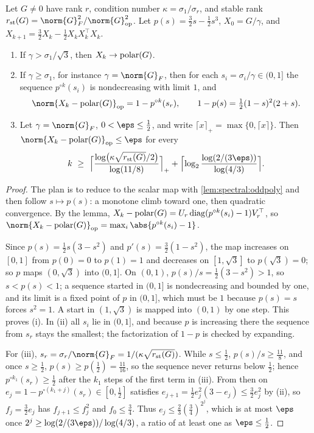 \begin{refsection}
\begin{theorem}\label{thm:spectral:ns}
Let $G\ne0$ have rank $r$, condition number $\kappa=\sigma_1/\sigma_r$, and stable rank $\spectralrst(G)=\norm{G}_F^2/\norm{G}_{\op}^2$. Let $p(s)=\frac32s-\frac12s^3$, $X_0=G/\gamma$, and $X_{k+1}=\frac32X_k-\frac12X_kX_k^\top X_k$.
\begin{enumerate}
\item If $\gamma>\sigma_1/\sqrt3$, then $X_k\to\operatorname{polar}(G)$.
\item If $\gamma\ge\sigma_1$, for instance $\gamma=\norm{G}_F$, then for each $s_i=\sigma_i/\gamma\in(0,1]$ the sequence $p^{\circ k}(s_i)$ is nondecreasing with limit $1$, and
\[
  \norm{X_k-\polar(G)}_{\op}=1-p^{\circ k}(s_r),\qquad 1-p(s)=\tfrac12(1-s)^2(2+s).
\]
\item Let $\gamma=\norm{G}_F$, $0<\eps\le\frac12$, and write $\lceil x\rceil_+=\max\{0,\lceil x\rceil\}$. Then $\norm{X_k-\polar(G)}_{\op}\le\eps$ for every
\[
  k\ \ge\ \Bigl\lceil\frac{\log\bigl(\kappa\sqrt{\spectralrst(G)}/2\bigr)}{\log(11/8)}\Bigr\rceil_+ +\Bigl\lceil\log_2\frac{\log(2/(3\eps))}{\log(4/3)}\Bigr\rceil .
\]
\end{enumerate}
\end{theorem}

\begin{proof}
The plan is to reduce to the scalar map with \cref{lem:spectral:oddpoly} and then follow $s\mapsto p(s)$: a monotone climb toward one, then quadratic convergence. By the lemma, $X_k-\operatorname{polar}(G)=U_r\operatorname{diag}(p^{\circ k}(s_i)-1)V_r^\top$, so $\norm{X_k-\polar(G)}_{\op}=\max_i\abs{p^{\circ k}(s_i)-1}$.

Since $p(s)=\frac12s(3-s^2)$ and $p'(s)=\frac32(1-s^2)$, the map increases on $[0,1]$ from $p(0)=0$ to $p(1)=1$ and decreases on $[1,\sqrt3]$ to $p(\sqrt3)=0$; so $p$ maps $(0,\sqrt3)$ into $(0,1]$. On $(0,1)$, $p(s)/s=\frac12(3-s^2)>1$, so $s<p(s)<1$; a sequence started in $(0,1]$ is nondecreasing and bounded by one, and its limit is a fixed point of $p$ in $(0,1]$, which must be $1$ because $p(s)=s$ forces $s^2=1$. A start in $(1,\sqrt3)$ is mapped into $(0,1)$ by one step. This proves (i). In (ii) all $s_i$ lie in $(0,1]$, and because $p$ is increasing there the sequence from $s_r$ stays the smallest; the factorization of $1-p$ is checked by expanding.

For (iii), $s_r=\sigma_r/\norm{G}_F=1/(\kappa\sqrt{\spectralrst(G)})$. While $s\le\frac12$, $p(s)/s\ge\frac{11}8$, and once $s\ge\frac12$, $p(s)\ge p(\frac12)=\frac{11}{16}$, so the sequence never returns below $\frac12$; hence $p^{\circ k_1}(s_r)\ge\frac12$ after the $k_1$ steps of the first term in (iii). From then on $e_j=1-p^{\circ(k_1+j)}(s_r)\in[0,\frac12]$ satisfies $e_{j+1}=\frac12e_j^2(3-e_j)\le\frac32e_j^2$ by (ii), so $f_j=\frac32e_j$ has $f_{j+1}\le f_j^2$ and $f_0\le\frac34$. Thus $e_j\le\frac23(\frac34)^{2^j}$, which is at most $\eps$ once $2^j\ge\log(2/(3\eps))/\log(4/3)$, a ratio of at least one as $\eps\le\frac12$.
\end{proof}


\end{refsection}
